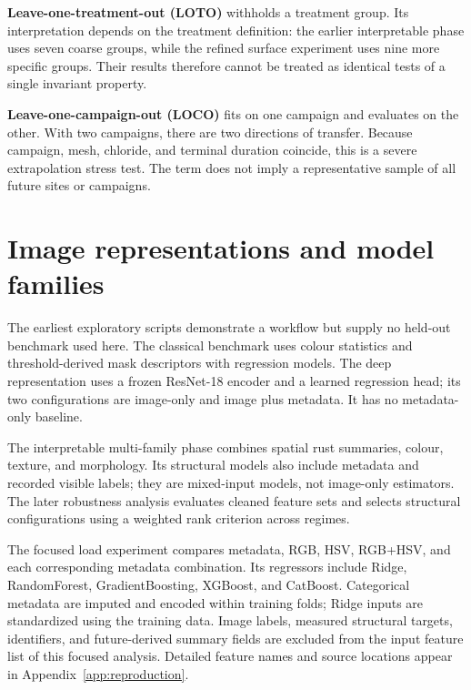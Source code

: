 \textbf{Leave-one-treatment-out (LOTO)} withholds a treatment group. Its interpretation depends on the treatment definition: the earlier interpretable phase uses seven coarse groups, while the refined surface experiment uses nine more specific groups. Their results therefore cannot be treated as identical tests of a single invariant property.

\textbf{Leave-one-campaign-out (LOCO)} fits on one campaign and evaluates on the other. With two campaigns, there are two directions of transfer. Because campaign, mesh, chloride, and terminal duration coincide, this is a severe extrapolation stress test. The term does not imply a representative sample of all future sites or campaigns.


\section{Image representations and model families}
The earliest exploratory scripts demonstrate a workflow but supply no held-out benchmark used here. The classical benchmark uses colour statistics and threshold-derived mask descriptors with regression models. The deep representation uses a frozen ResNet-18 encoder and a learned regression head; its two configurations are image-only and image plus metadata. It has no metadata-only baseline.

The interpretable multi-family phase combines spatial rust summaries, colour, texture, and morphology. Its structural models also include metadata and recorded visible labels; they are mixed-input models, not image-only estimators. The later robustness analysis evaluates cleaned feature sets and selects structural configurations using a weighted rank criterion across regimes.

The focused load experiment compares metadata, RGB, HSV, RGB+HSV, and each corresponding metadata combination. Its regressors include Ridge, RandomForest, GradientBoosting, XGBoost, and CatBoost. Categorical metadata are imputed and encoded within training folds; Ridge inputs are standardized using the training data. Image labels, measured structural targets, identifiers, and future-derived summary fields are excluded from the input feature list of this focused analysis. Detailed feature names and source locations appear in Appendix~\ref{app:reproduction}.

